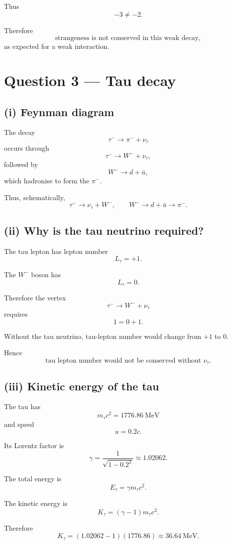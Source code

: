 \documentclass[11pt,a4paper]{article}
\begin{document}
Thus
\[
-3\neq-2.
\]

Therefore
\[
\boxed{\text{strangeness is not conserved in this weak decay}},
\]
as expected for a weak interaction.

\section{Question 3 --- Tau decay}

\subsection{(i) Feynman diagram}

The decay
\[
\tau^-\rightarrow\pi^-+\nu_\tau
\]
occurs through
\[
\tau^-\rightarrow W^-+\nu_\tau,
\]
followed by
\[
W^-\rightarrow d+\bar u,
\]
which hadronise to form the $\pi^-$.

Thus, schematically,
\[
\tau^-
\longrightarrow
\nu_\tau+W^-,
\qquad
W^-\longrightarrow d+\bar u
\longrightarrow\pi^-.
\]

\subsection{(ii) Why is the tau neutrino required?}

The tau lepton has lepton number
\[
L_\tau=+1.
\]

The $W^-$ boson has
\[
L_\tau=0.
\]

Therefore the vertex
\[
\tau^-\rightarrow W^-+\nu_\tau
\]
requires
\[
1=0+1.
\]

Without the tau neutrino, tau-lepton number would change from $+1$ to $0$.

Hence
\[
\boxed{\text{tau lepton number would not be conserved without }\nu_\tau}.
\]

\subsection{(iii) Kinetic energy of the tau}

The tau has
\[
m_\tau c^2=1776.86\ \mathrm{MeV}
\]
and speed
\[
u=0.2c.
\]

Its Lorentz factor is
\[
\gamma=
\frac{1}{\sqrt{1-0.2^2}}
\approx1.02062.
\]

The total energy is
\[
E_\tau=\gamma m_\tau c^2.
\]

The kinetic energy is
\[
K_\tau=(\gamma-1)m_\tau c^2.
\]

Therefore
\[
K_\tau
=
(1.02062-1)(1776.86)
\approx36.64\ \mathrm{MeV}.
\]
\end{document}

